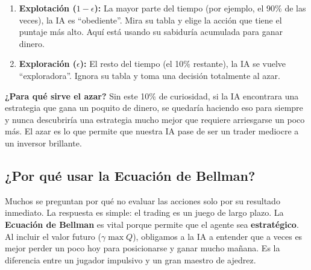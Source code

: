 \documentclass[12pt,a4paper]{article}
\begin{document}
\begin{enumerate}
    \item \textbf{Explotación ($1-\epsilon$):} La mayor parte del tiempo (por ejemplo, el 90\% de las veces), la IA es ``obediente''. Mira su tabla y elige la acción que tiene el puntaje más alto. Aquí está usando su sabiduría acumulada para ganar dinero.
    \item \textbf{Exploración ($\epsilon$):} El resto del tiempo (el 10\% restante), la IA se vuelve ``exploradora''. Ignora su tabla y toma una decisión totalmente al azar. 
\end{enumerate}

\textbf{¿Para qué sirve el azar?} Sin este 10\% de curiosidad, si la IA encontrara una estrategia que gana un poquito de dinero, se quedaría haciendo eso para siempre y nunca descubriría una estrategia mucho mejor que requiere arriesgarse un poco más. El azar es lo que permite que nuestra IA pase de ser un trader mediocre a un inversor brillante.

\subsection{¿Por qué usar la Ecuación de Bellman?}
Muchos se preguntan por qué no evaluar las acciones solo por su resultado inmediato. La respuesta es simple: el trading es un juego de largo plazo. La \textbf{Ecuación de Bellman} es vital porque permite que el agente sea \textbf{estratégico}. Al incluir el valor futuro ($\gamma \max Q$), obligamos a la IA a entender que a veces es mejor perder un poco hoy para posicionarse y ganar mucho mañana. Es la diferencia entre un jugador impulsivo y un gran maestro de ajedrez.
\end{document}
